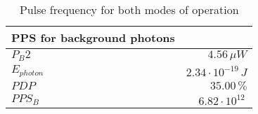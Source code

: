 \begin{table}[H]
\centering
\caption{Pulse frequency for both modes of operation}
\label{tab:PPS}
\begin{tabular}{|l|r|}\hline
    \textbf{PPS for background photons} & \\
    \hline 
    $P_B2$ & $4.56\,\mu W$ \\
    $E_{photon}$ & $2.34\cdot10^{-19}\,J$ \\
    $PDP$ & $35.00\, \%$ \\
    $PPS_B$ & $6.82\cdot10^{12}\,$ \\
    \hline 
\end{tabular}
\end{table}
